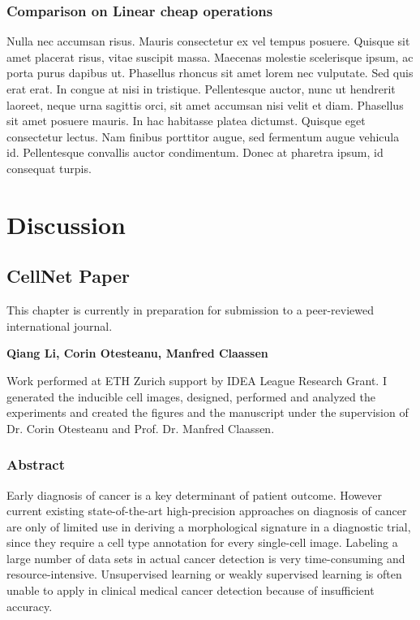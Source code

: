 \subsection{Comparison on Linear cheap operations} %
\label{sub:amet}
Nulla nec accumsan risus. Mauris consectetur ex vel tempus posuere. Quisque sit amet placerat risus, vitae suscipit massa. Maecenas molestie scelerisque ipsum, ac porta purus dapibus ut. Phasellus rhoncus sit amet lorem nec vulputate. Sed quis erat erat. In congue at nisi in tristique. Pellentesque auctor, nunc ut hendrerit laoreet, neque urna sagittis orci, sit amet accumsan nisi velit et diam. Phasellus sit amet posuere mauris. In hac habitasse platea dictumst. Quisque eget consectetur lectus. Nam finibus porttitor augue, sed fermentum augue vehicula id. Pellentesque convallis auctor condimentum. Donec at pharetra ipsum, id consequat turpis.






\chapter{Discussion}
\label{sec:examples}

\section{CellNet Paper}
\label{sec:lorem}

This chapter is currently in preparation for submission to a peer-reviewed international journal.

\textbf{Qiang Li, Corin Otesteanu, Manfred Claassen}

Work performed at ETH Zurich support by IDEA League Research Grant.
I generated the inducible cell images, designed, performed and analyzed the experiments and created the figures and the manuscript under the supervision of Dr. Corin Otesteanu and Prof. Dr. Manfred Claassen.

\subsection{Abstract}
\label{sec:abstract}
Early diagnosis of cancer is a key determinant of patient outcome. However current existing state-of-the-art high-precision approaches on diagnosis of cancer are only of limited use in deriving a morphological signature in a diagnostic trial, since they require a cell type annotation for every single-cell image. Labeling a large number of data sets in actual cancer detection is very time-consuming and resource-intensive. Unsupervised learning or weakly supervised learning is often unable to apply in clinical medical cancer detection because of insufficient accuracy.

